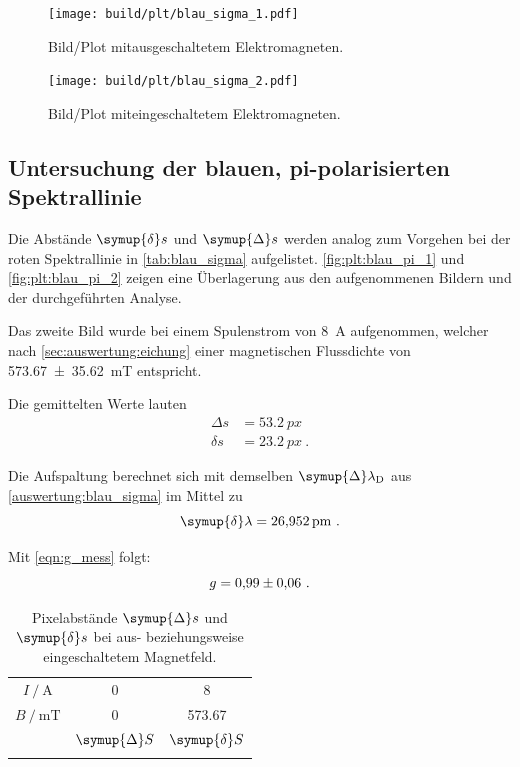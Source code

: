 \begin{figure}[H]
    \centering
    \texttt{[image: build/plt/blau\_sigma\_1.pdf]}
    \caption{Bild/Plot mitausgeschaltetem Elektromagneten.}
    \label{fig:plt:blau_sigma_1}
\end{figure}

\begin{figure}[H]
    \centering
    \texttt{[image: build/plt/blau\_sigma\_2.pdf]}
    \caption{Bild/Plot miteingeschaltetem Elektromagneten.}
    \label{fig:plt:blau_sigma_2}
\end{figure}


\FloatBarrier
\subsection{Untersuchung der blauen, pi-polarisierten Spektrallinie}
Die Abstände $\symup{\delta} s$ und $\symup{\Delta} s$ werden analog zum Vorgehen bei der roten Spektrallinie
in \autoref{tab:blau_sigma} aufgelistet.
\autoref{fig:plt:blau_pi_1} und \autoref{fig:plt:blau_pi_2} zeigen eine Überlagerung
aus den aufgenommenen Bildern und der durchgeführten Analyse.

Das zweite Bild wurde bei einem Spulenstrom von \SI{8}{\ampere} aufgenommen,
welcher nach \autoref{sec:auswertung:eichung} einer magnetischen Flussdichte von \SI{573.67 \pm 35.62}{\milli\tesla} entspricht.

Die gemittelten Werte lauten
\begin{align*}
    Δs &= \SI{53.2}{px} \\
    δs &= \SI{23.2}{px} \ .
\end{align*}


Die Aufspaltung berechnet sich
mit demselben $\symup{\Delta}\lambda_\text{D}$ aus \autoref{auswertung:blau_sigma}
im Mittel zu
\[
    \symup{\delta} \lambda = \SI{26.952}{\pico\meter} \ .
\]

Mit \autoref{eqn:g_mess} folgt:
\[
    g = \num{0.99 \pm 0.06} \ .
\]

\begin{table}[H]
    \centering
    \caption{Pixelabstände $\symup{\Delta} s$ und $\symup{\delta} s$ bei aus- beziehungsweise eingeschaltetem Magnetfeld.}
    \label{tab:blau_pi}
    \begin{tabular}{S S S}
        \toprule
        {$I \mathbin{/} \si{\ampere}$} & 0 & 8 \\
        {$B \mathbin{/} \si{\milli\tesla}$} & 0 & 573.67  \\
        \midrule
        & {$\symup{\Delta} S$} & {$\symup{\delta} S$} \\
        \midrule
        \bottomrule
    \end{tabular}
\end{table}

